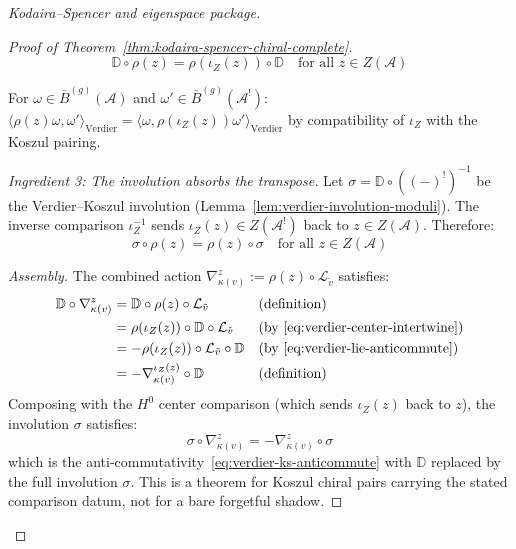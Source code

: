 \begin{proof}[Kodaira--Spencer and eigenspace package]
\begin{proof}[Proof of Theorem~\ref{thm:kodaira-spencer-chiral-complete}]
\begin{equation}\label{eq:verdier-center-intertwine}
\mathbb{D} \circ \rho(z) = \rho(\iota_Z(z)) \circ \mathbb{D}
\quad \text{for all } z \in Z(\mathcal{A})
\end{equation}

For $\omega \in \bar{B}^{(g)}(\mathcal{A})$ and $\omega' \in \bar{B}^{(g)}(\mathcal{A}^!)$:
$\langle \rho(z)\omega, \omega' \rangle_{\mathrm{Verdier}} =
\langle \omega, \rho(\iota_Z(z))\omega' \rangle_{\mathrm{Verdier}}$
by compatibility of $\iota_Z$ with the Koszul pairing.

\emph{Ingredient 3: The involution absorbs the transpose.}
Let $\sigma = \mathbb{D} \circ ((-)^!)^{-1}$ be the Verdier--Koszul involution
(Lemma~\ref{lem:verdier-involution-moduli}). The inverse comparison
$\iota_Z^{-1}$ sends $\iota_Z(z) \in Z(\mathcal{A}^!)$ back to
$z \in Z(\mathcal{A})$. Therefore:
\begin{equation}
\sigma \circ \rho(z) = \rho(z) \circ \sigma
\quad \text{for all } z \in Z(\mathcal{A})
\end{equation}

\emph{Assembly.} The combined action $\nabla_{\kappa(v)}^z := \rho(z) \circ
\mathcal{L}_{\tilde{v}}$ satisfies:
\begin{align}
\mathbb{D} \circ \nabla_{\kappa(v)}^z
&= \mathbb{D} \circ \rho(z) \circ \mathcal{L}_{\tilde{v}}
&& \text{(definition)} \\
&= \rho(\iota_Z(z)) \circ \mathbb{D} \circ \mathcal{L}_{\tilde{v}}
&& \text{(by~\eqref{eq:verdier-center-intertwine})} \\
&= -\rho(\iota_Z(z)) \circ \mathcal{L}_{\tilde{v}} \circ \mathbb{D}
&& \text{(by~\eqref{eq:verdier-lie-anticommute})} \\
&= -\nabla_{\kappa(v)}^{\iota_Z(z)} \circ \mathbb{D}
&& \text{(definition)}
\end{align}
Composing with the $H^0$ center comparison (which sends $\iota_Z(z)$ back to $z$), the
involution $\sigma$ satisfies:
\begin{equation}
\sigma \circ \nabla_{\kappa(v)}^z = -\nabla_{\kappa(v)}^z \circ \sigma
\end{equation}
which is the anti-commutativity~\eqref{eq:verdier-ks-anticommute} with $\mathbb{D}$
replaced by the full involution $\sigma$. This is a theorem for Koszul chiral
pairs carrying the stated comparison datum, not for a bare forgetful shadow.


\end{proof}
\end{proof}
